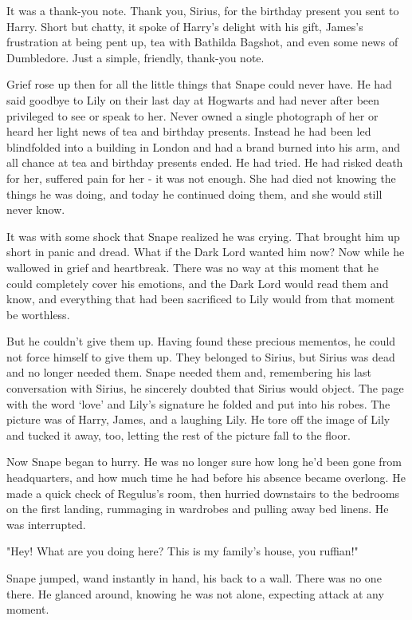 \documentclass[a4paper,11pt]{article}
\begin{document}
It was a thank-you note. Thank you, Sirius, for the birthday present you sent to Harry. Short but chatty, it spoke of Harry's delight with his gift, James's frustration at being pent up, tea with Bathilda Bagshot, and even some news of Dumbledore. Just a simple, friendly, thank-you note.

Grief rose up then for all the little things that Snape could never have. He had said goodbye to Lily on their last day at Hogwarts and had never after been privileged to see or speak to her. Never owned a single photograph of her or heard her light news of tea and birthday presents. Instead he had been led blindfolded into a building in London and had a brand burned into his arm, and all chance at tea and birthday presents ended. He had tried. He had risked death for her, suffered pain for her - it was not enough. She had died not knowing the things he was doing, and today he continued doing them, and she would still never know.

It was with some shock that Snape realized he was crying. That brought him up short in panic and dread. What if the Dark Lord wanted him now? Now while he wallowed in grief and heartbreak. There was no way at this moment that he could completely cover his emotions, and the Dark Lord would read them and know, and everything that had been sacrificed to Lily would from that moment be worthless.

But he couldn't give them up. Having found these precious mementos, he could not force himself to give them up. They belonged to Sirius, but Sirius was dead and no longer needed them. Snape needed them and, remembering his last conversation with Sirius, he sincerely doubted that Sirius would object. The page with the word `love' and Lily's signature he folded and put into his robes. The picture was of Harry, James, and a laughing Lily. He tore off the image of Lily and tucked it away, too, letting the rest of the picture fall to the floor.

Now Snape began to hurry. He was no longer sure how long he'd been gone from headquarters, and how much time he had before his absence became overlong. He made a quick check of Regulus's room, then hurried downstairs to the bedrooms on the first landing, rummaging in wardrobes and pulling away bed linens. He was interrupted.

"Hey! What are you doing here? This is my family's house, you ruffian!"

Snape jumped, wand instantly in hand, his back to a wall. There was no one there. He glanced around, knowing he was not alone, expecting attack at any moment.
\end{document}
